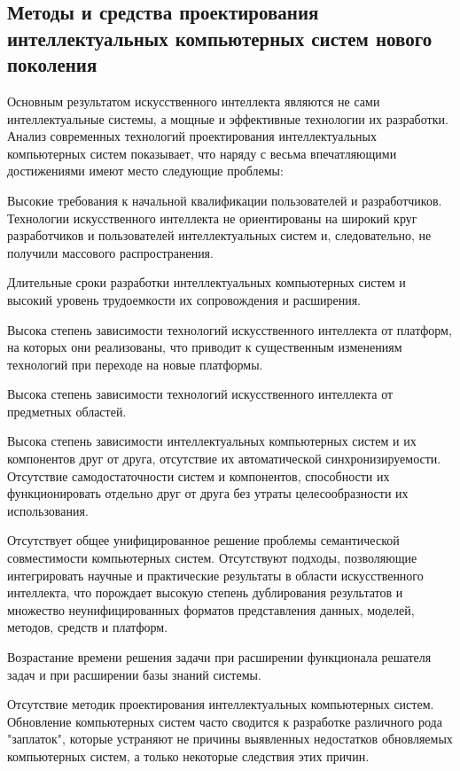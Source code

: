 \begin{partbacktext}
\part{Методы и средства проектирования интеллектуальных компьютерных систем нового поколения}
\noindent
Основным результатом искусственного интеллекта являются не сами интеллектуальные системы, а мощные и эффективные технологии их разработки. Анализ современных технологий проектирования интеллектуальных компьютерных систем показывает, что наряду с весьма впечатляющими достижениями имеют место следующие проблемы:
\begin{textitemize}
	\item Высокие требования к начальной квалификации пользователей и разработчиков. Технологии искусственного интеллекта не ориентированы на широкий круг разработчиков и пользователей интеллектуальных систем и, следовательно, не получили массового распространения.
	\item Длительные сроки разработки интеллектуальных компьютерных систем и высокий уровень трудоемкости их сопровождения и расширения.
	\item Высока степень зависимости технологий искусственного интеллекта от платформ, на которых они реализованы, что приводит к существенным изменениям технологий при переходе на новые платформы.
	\item Высока степень зависимости технологий искусственного интеллекта от предметных областей.
	\item Высока степень зависимости интеллектуальных компьютерных систем и их компонентов друг от друга, отсутствие их автоматической синхронизируемости. Отсутствие самодостаточности систем и компонентов, способности их функционировать отдельно друг от друга без утраты целесообразности их использования.
	\item Отсутствует общее унифицированное решение проблемы семантической совместимости компьютерных систем. Отсутствуют подходы, позволяющие интегрировать научные и практические результаты в области искусственного интеллекта, что порождает высокую степень дублирования результатов и множество неунифицированных форматов представления данных, моделей, методов, средств и платформ.
	\item Возрастание времени решения задачи при расширении функционала решателя задач и при расширении базы знаний системы.
	\item Отсутствие методик проектирования интеллектуальных компьютерных систем. Обновление компьютерных систем часто сводится к разработке	различного рода "заплаток"{}, которые устраняют не причины выявленных недостатков обновляемых компьютерных систем, а только некоторые следствия этих причин.

\end{textitemize}
\end{partbacktext}
